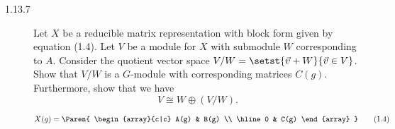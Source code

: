 \documentclass{math174}
\date{Wednesday, February 13}
\author{}
\begin{document}
\begin{description}
\item[1.13.7] Let \(X\) be a reducible matrix representation with
  block form given by equation (1.4).  Let \(V\) be a module for \(X\)
  with submodule \(W\) corresponding to \(A\).  Consider the quotient
  vector space \(V/W = \setst{\vec v + W}{\vec v \in V}\).  Show that
  \(V/W\) is a \(G\)-module with corresponding matrices \(C(g)\).
  Furthermore, show that we have
  \[
    V \cong W \oplus (V/W).
  \]

  \begin{book}
    \[
      X(g) =
      \Paren{
        \begin{array}{c|c}
          A(g) & B(g) \\ \hline
          0    & C(g)
        \end{array}
      }
      \tag{1.4}
    \]
  \end{book}

  \begin{solution}

  \end{solution}
\end{description}
\end{document}
